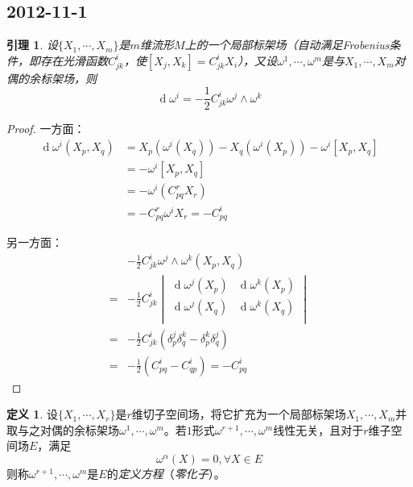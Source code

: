 \documentclass[winfonts,UTF8,c5size,a4paper,fancyhdr,hyperref,titlepage,nocap]{ctexart}
\newtheorem{lem}[thm]{引理}
\theoremstyle{definition}
\newtheorem{defn}[thm]{定义}
\theoremstyle{remark}
\numberwithin{equation}{subsection}
\newcommand{\red}{\color{red}}
\newcommand{\dd}{\operatorname{d}}
\begin{document}
\subsection*{2012-11-1}
\begin{lem}\label{lem8.1}
  设$\{X_1,\cdots,X_m\}$是$m$维流形$M$上的一个局部标架场（自动满足Frobenius条件，即存在光滑函数$C^i_{jk}$，使$[X_j,X_k]=C^i_{jk}X_i$），又设$\omega^1,\cdots,\omega^m$是与$X_1,\cdots,X_m$对偶的余标架场，则
  \begin{equation*}
    \dd\omega^i=-\frac{1}{2}C^i_{jk}\omega^j\wedge\omega^k
  \end{equation*}
\end{lem}
\begin{proof}
  一方面：
\begin{align*}
\dd\omega^i(X_p,X_q)&=X_p(\omega^i(X_q))-X_q(\omega^i(X_p))-\omega^i[X_p,X_q]\\
                    &=-\omega^i[X_p,X_q]\\
                    &=-\omega^i(C^r_{pq}X_r)\\
                    &=-C^r_{pq}\omega^iX_r=-C^i_{pq}
\end{align*}

另一方面：
\begin{align*}
  &-\frac{1}{2}C^i_{jk}\omega^j\wedge\omega^k(X_p,X_q)\\
 =&-\frac{1}{2}C^i_{jk}
                \begin{vmatrix}
                 \dd \omega^j(X_p) & \dd \omega^k(X_p) \\
                 \dd \omega^j(X_q) & \dd \omega^k(X_q) \\
                \end{vmatrix}\\
 =&-\frac{1}{2}C^i_{jk}(\delta^j_p\delta^k_q-\delta^k_p\delta^j_q)\\
 =&-\frac{1}{2}(C^i_{pq}-C^i_{qp})=-C^i_{pq}
\end{align*}
\end{proof}
\begin{defn}
  设$\{X_1,\cdots,X_r\}$是$r$维切子空间场，将它扩充为一个局部标架场$X_1,\cdots,X_m$并取与之对偶的余标架场$\omega^1,\cdots,\omega^m$。若$1$形式$\omega^{r+1},\cdots,\omega^m$线性无关，且对于$r$维子空间场$E$，满足
\begin{equation*}
\omega^{\alpha}(X)=0,\forall X\in E
\end{equation*}
则称$\omega^{r+1},\cdots,\omega^m$是$E$的\emph{\red 定义方程}（\emph{\red 零化子}）。
\end{defn}
\end{document}
